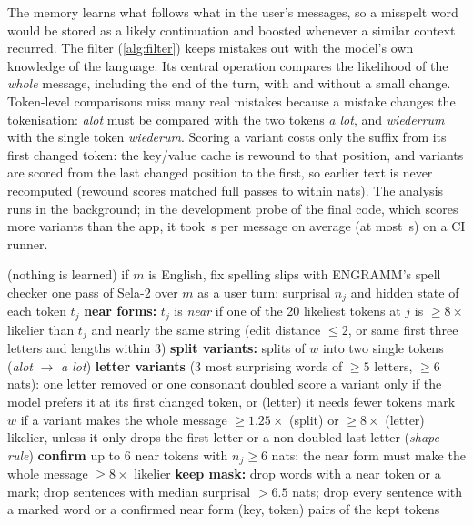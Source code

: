 \documentclass[10pt,twocolumn]{article}
\newcommand{\cfile}[1]{\texttt{\detokenize{#1}}}%
\begin{document}
The memory learns what follows what in the user's messages, so a misspelt word would be stored as a likely continuation
and boosted whenever a similar context recurred. The filter (\cref{alg:filter}) keeps mistakes out with the model's own
knowledge of the language. Its central operation compares the likelihood of the \emph{whole} message, including the end
of the turn, with and without a small change. Token-level comparisons miss many real mistakes because a mistake changes
the tokenisation: \emph{alot} must be compared with the two tokens \emph{a lot}, and \emph{wiederrum} with the single
token \emph{wiederum}. Scoring a variant costs only the suffix from its first changed token: the key/value cache is
rewound to that position, and variants are scored from the last changed position to the first, so earlier text is never
recomputed (rewound scores matched full passes to within  nats). The analysis runs in the background; in
the development probe of the final code, which scores more variants than the app, it took \,s per
message on average (at most \,s) on a CI runner.

\begin{algorithm}[t]
\caption{Admitting one user message to the memory (\cfile{engramm/lm/sela_learn.py}).}
\label{alg:filter}
\footnotesize
\begin{algorithmic}[1]
  \State \Return (nothing is learned)
\EndIf
\State if $m$ is English, fix spelling slips with ENGRAMM's spell checker
\State one pass of Sela-2 over $m$ as a user turn: surprisal $n_j$ and hidden state of each token $t_j$
\State \textbf{near forms:} $t_j$ is \emph{near} if one of the 20 likeliest tokens at $j$ is $\geq 8\times$ likelier than $t_j$ and nearly the same string (edit distance $\leq 2$, or same first three letters and lengths within 3)
  \State \textbf{split variants:} splits of $w$ into two single tokens (\emph{alot} $\to$ \emph{a lot})
  \State \textbf{letter variants} (3 most surprising words of $\geq 5$ letters, $\geq 6$ nats): one letter removed or one consonant doubled
  \State score a variant only if the model prefers it at its first changed token, or (letter) it needs fewer tokens
  \State mark $w$ if a variant makes the whole message $\geq 1.25\times$ (split) or $\geq 8\times$ (letter) likelier, unless it only drops the first letter or a non-doubled last letter (\emph{shape rule})
\EndFor
\State \textbf{confirm} up to 6 near tokens with $n_j \geq 6$ nats: the near form must make the whole message $\geq 8\times$ likelier
\State \textbf{keep mask:} drop words with a near token or a mark; drop sentences with median surprisal $> 6.5$ nats; drop every sentence with a marked word or a confirmed near form
\State \Return (key, token) pairs of the kept tokens
\end{algorithmic}
\end{algorithm}
\end{document}
